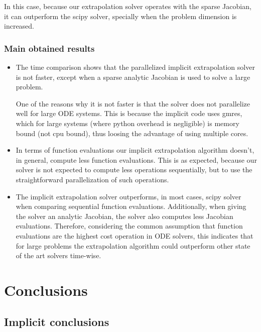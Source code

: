 \documentclass[12pt]{article}
\begin{document}
In this case, because our extrapolation solver operates with the sparse Jacobian, it can outperform the scipy solver, specially when the problem dimension is increased.

\subsubsection{Main obtained results}
\begin{itemize}
\item The time comparison shows that the parallelized implicit extrapolation solver is not faster, except when a sparse analytic Jacobian is used to solve a large problem. 

One of the reasons why it is not faster is that the solver does not parallelize well for large ODE systems. This is because the implicit code uses gmres, which for large systems (where python overhead is negligible) is memory bound (not cpu bound), thus loosing the advantage of using multiple cores.

\item In terms of function evaluations our implicit extrapolation algorithm doesn't, in general, compute less function evaluations. This is as expected, because our solver is not expected to compute less operations sequentially, but to use the straightforward parallelization of such operations.

\item The implicit extrapolation solver outperforms, in most cases, scipy solver when comparing sequential function evaluations. Additionally, when giving the solver an analytic Jacobian, the solver also computes less Jacobian evaluations. Therefore, considering the common assumption that function evaluations are the highest cost operation in ODE solvers, this indicates that for large problems the extrapolation algorithm could outperform other state of the art solvers time-wise.

\end{itemize}

\section{Conclusions}

\subsection{Implicit conclusions}
\end{document}
